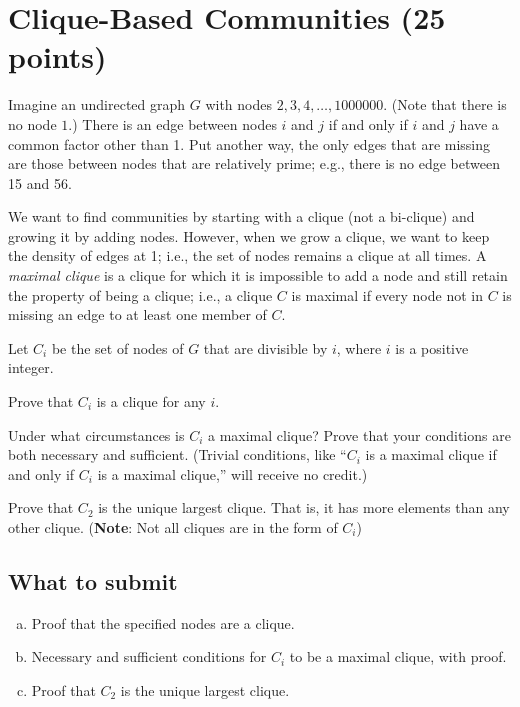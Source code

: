\section{Clique-Based Communities (25 points)}

Imagine an undirected graph $G$ with nodes $2,3,4,\ldots,1000000$.  (Note that there is no node $1$.)  There is an edge between nodes $i$ and $j$ if and only if $i$ and $j$ have a common factor other than 1.  Put another way, the only edges that are missing are those between nodes that are relatively prime; e.g., there is no edge between 15 and 56.

We want to find communities by starting with a clique (not a bi-clique) and growing it by adding nodes.  However, when we grow a clique, we want to keep the density of edges at 1; i.e., the set of nodes remains a clique at all times.  A {\em maximal clique} is a clique for which it is impossible to add a node and still retain the property of being a clique; i.e., a clique $C$ is maximal if every node not in $C$ is missing an edge to at least one member of $C$.

Let $C_i$ be the set of nodes of $G$ that are divisible by $i$, where $i$ is a positive integer. 

 Prove that $C_i$ is a clique for any $i$. 

 Under what circumstances is $C_i$ a maximal clique?  Prove that your conditions are both necessary and sufficient.  (Trivial conditions, like ``$C_i$ is a maximal clique if and only if $C_i$ is a maximal clique,'' will receive no credit.)


Prove that $C_2$ is the unique largest clique. That is, it has more elements than any other clique. (\textbf{Note}: Not all cliques are in the form of $C_i$)

\subsection*{What to submit}
\begin{enumerate}[(a)]
\item Proof that the specified nodes are a clique.
\item Necessary and sufficient conditions for $C_i$ to be a maximal clique, with proof.
\item Proof that $C_2$ is the unique largest clique.
\end{enumerate}

